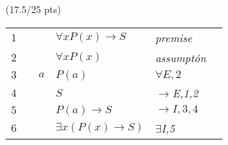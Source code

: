 \documentclass[a4paper,12pt]{article}
\begin{document}
\hfill \small{(17.5/25 pts)}\\
\begin{tcolorbox}
\begin{table}[H]
	\centering

	\begin{tabular}{*6{l}}
		$1$ & & & $\forall x P(x) \rightarrow S$ & \textit{premise} &  \\\cline{2-6}
		
		$2$ & \multicolumn{1}{|c}{} &  &  $\forall x P(x)$ & \textit{assumptón} & \multicolumn{1}{c|}{} \\
		 
		$3$ & \multicolumn{1}{|c}{} & \textit{$a$}& $P(a)$ & \textit{$\forall E,2$} & \multicolumn{1}{c|}{} \\ 
		
		$4$ & \multicolumn{1}{|c}{} &  &  $S$ & \textit{$\rightarrow$E,1,2} & \multicolumn{1}{c|}{} \\ \cline{2-6}
		
        $5$ & & & $P(a) \rightarrow S$ & \textit{$\rightarrow I,3,4$} &  \\ 
		
		$6$ & & & $\exists x (P(x)\rightarrow S) $ & {\textit{$\exists$I,5}} & \\
		
		
	\end{tabular}
\end{table}
\vspace{1cm} %
\end{tcolorbox}
\end{document}
